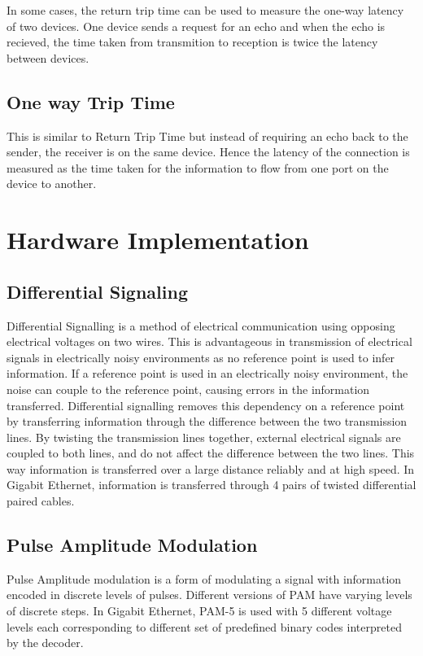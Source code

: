 In some cases, the return trip time can be used to measure the one-way latency of two devices. One
device sends a request for an echo and when the echo is recieved, the time taken from transmition to reception is
twice the latency between devices.

\subsection{One way Trip Time}

This is similar to Return Trip Time but instead of requiring an echo back to the sender, the receiver is on the
same device. Hence the latency of the connection is measured as the time taken for the information
to flow from one port on the device to another.

\section{Hardware Implementation}

\subsection{Differential Signaling}
Differential Signalling is a method of electrical communication using opposing electrical voltages on two wires. This is advantageous in transmission of electrical signals in electrically noisy environments as no reference point is used to infer information. If a reference point is used in an electrically noisy environment, the noise can couple to the reference point, causing errors in the information transferred. Differential signalling removes this dependency on a reference point by transferring information through the difference between the two transmission lines. By twisting the transmission lines together, external electrical signals are coupled to both lines, and do not affect the difference between the two lines. This way information is transferred over a large distance reliably and at high speed. In Gigabit Ethernet, information is transferred through 4 pairs of twisted differential paired cables.

\subsection{Pulse Amplitude Modulation}
Pulse Amplitude modulation is a form of modulating a signal with information encoded in discrete levels of pulses. Different versions of PAM have varying levels of discrete steps. In Gigabit Ethernet, PAM-5 is used with 5 different voltage levels each corresponding to different set of predefined binary codes interpreted by the decoder.

